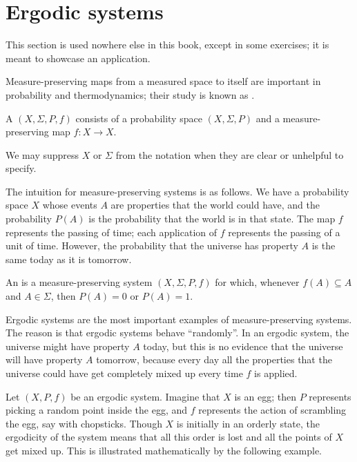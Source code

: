 \section{Ergodic systems}
This section is used nowhere else in this book, except in some exercises; it is meant to showcase an application.

Measure-preserving maps from a measured space to itself are important in probability and thermodynamics; their study is known as .

\begin{definition}
A  $(X, \Sigma, P, f)$ consists of a probability space $(X, \Sigma, P)$ and a measure-preserving map $f: X \to X$.
\end{definition}

\begin{subsec}
We may suppress $X$ or $\Sigma$ from the notation when they are clear or unhelpful to specify.
\end{subsec}

\begin{subsec}
The intuition for measure-preserving systems is as follows.
We have a probability space $X$ whose events $A$ are properties that the world could have, and the probability $P(A)$ is the probability that the world is in that state.
The map $f$ represents the passing of time; each application of $f$ represents the passing of a unit of time.
However, the probability that the universe has property $A$ is the same today as it is tomorrow.
\end{subsec}

\begin{definition}
An  is a measure-preserving system $(X, \Sigma, P, f)$ for which, whenever $f(A) \subseteq A$ and $A \in \Sigma$, then $P(A) = 0$ or $P(A) = 1$.
\end{definition}

\begin{subsec}
Ergodic systems are the most important examples of measure-preserving systems.
The reason is that ergodic systems behave ``randomly''.
In an ergodic system, the universe might have property $A$ today, but this is no evidence that the universe will have property $A$ tomorrow, because every day all the properties that the universe could have get completely mixed up every time $f$ is applied.

Let $(X, P, f)$ be an ergodic system.
Imagine that $X$ is an egg; then $P$ represents picking a random point inside the egg, and $f$ represents the action of scrambling the egg, say with chopsticks.
Though $X$ is initially in an orderly state, the ergodicity of the system means that all this order is lost and all the points of $X$ get mixed up.
This is illustrated mathematically by the following example.
\end{subsec}

